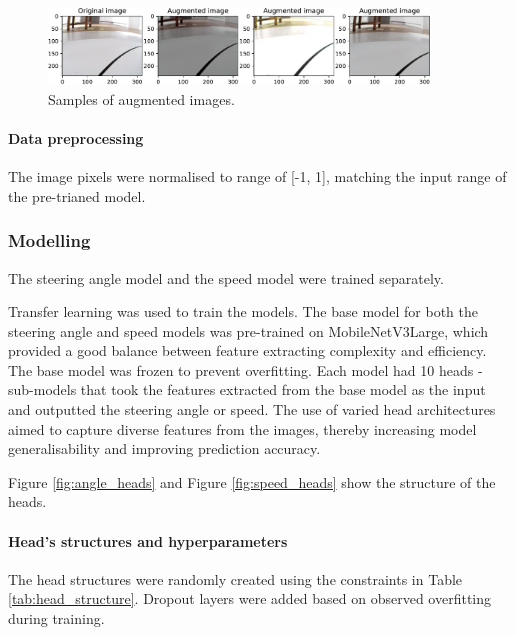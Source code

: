 \documentclass{article}
\begin{document}
\begin{figure}[h]
  \centering
  \includegraphics[width=0.9\textwidth]{figures/augmentation.pdf}
  \caption{Samples of augmented images.}
  \label{fig:augmentation}
\end{figure}

\paragraph{Data preprocessing}
\label{sec:data_preprocessing}
The image pixels were normalised to range of [-1, 1], matching the input range of the pre-trianed model.

\subsubsection{Modelling}
The steering angle model and the speed model were trained separately.

Transfer learning was used to train the models. The base model for both the steering angle and speed models was pre-trained on MobileNetV3Large, which provided a good balance between feature extracting complexity and efficiency. The base model was frozen to prevent overfitting. Each model had 10 heads - sub-models that took the features extracted from the base model as the input and outputted the steering angle or speed. The use of varied head architectures aimed to capture diverse features from the images, thereby increasing model generalisability and improving prediction accuracy.

Figure \ref{fig:angle_heads} and Figure \ref{fig:speed_heads} show the structure of the heads.

\paragraph{Head's structures and hyperparameters}
\label{sec:structures_and_hyperparameters}

The head structures were randomly created using the constraints in Table \ref{tab:head_structure}. Dropout layers were added based on observed overfitting during training.
\end{document}
